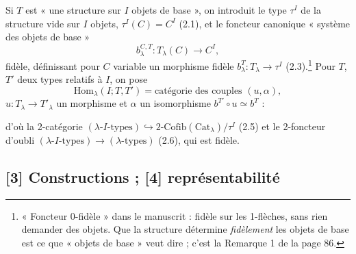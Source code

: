 \documentclass[11pt,a4paper]{article}
\begin{document}
Si $T$ est « une structure sur $I$ objets de base », on introduit le type
$\tau^{I}$ de la structure vide sur $I$ objets, $\tau^{I}(C) = C^{I}$
(2.1), et le foncteur canonique « système des objets de base »
\begin{equation}
b^{C,T}_{\lambda} : T_{\lambda}(C) \longrightarrow C^{I}, \tag{2.2}
\end{equation}
fidèle, définissant pour $C$ variable un morphisme fidèle $b^{T}_{\lambda}
: T_{\lambda} \to \tau^{I}$ (2.3).\footnote{« Foncteur 0-fidèle » dans le
manuscrit : fidèle sur les 1-flèches, sans rien demander des objets. Que
la structure détermine \emph{fidèlement} les objets de base est ce que
« objets de base » veut dire ; c'est la Remarque 1 de la page 86.} Pour
$T$, $T'$ deux types relatifs à $I$, on pose
\begin{equation}
\mathrm{Hom}_{\lambda}(I ; T, T') = \text{catégorie des couples } (u, \alpha),
\tag{2.4}
\end{equation}
$u : T_{\lambda} \to T'_{\lambda}$ un morphisme et $\alpha$ un isomorphisme
$b^{T'} \circ u \simeq b^{T}$ :


d'où la 2-catégorie $(\lambda\text{-}I\text{-types}) \hookrightarrow
\text{2-Cofib}(\mathrm{Cat}_{\lambda})/\tau^{I}$ (2.5) et le 2-foncteur d'oubli
$(\lambda\text{-}I\text{-types}) \to (\lambda\text{-types})$ (2.6), qui est
fidèle.

\subsection*{[3] Constructions ; [4] représentabilité}
\end{document}

